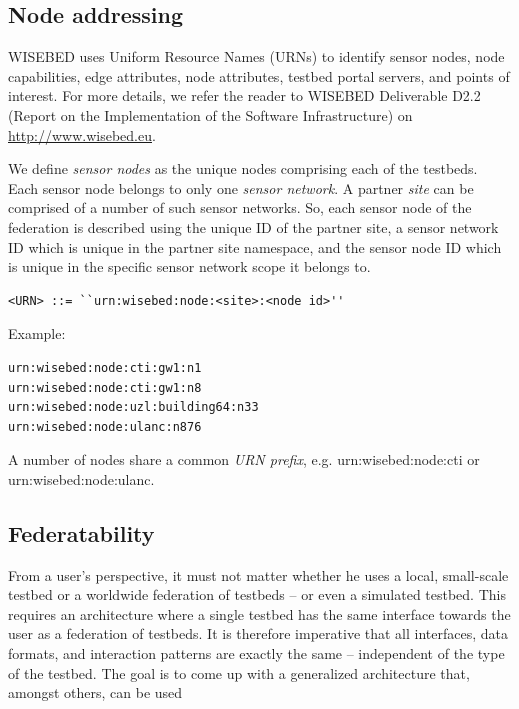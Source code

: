 \documentclass[a4paper,11pt]{article}
\begin{document}
	\subsection{Node addressing}
	\label{sec:addressing}
WISEBED uses Uniform Resource Names (URNs) to identify sensor nodes, node capabilities, edge attributes, node attributes, testbed portal servers, and points of interest. For more details, we refer the reader to WISEBED Deliverable D2.2 (Report on the Implementation of the Software Infrastructure) on \url{http://www.wisebed.eu}.

We define \textit{sensor nodes }as the unique nodes comprising each of the testbeds. Each sensor node belongs to only one \textit{sensor network}. A partner \textit{site} can be comprised of a number of such sensor networks. So, each sensor node of the federation is described using the unique ID of the partner site, a sensor network ID which is unique in the partner site namespace, and the sensor node ID which is unique in the specific sensor network scope it belongs to. 

\begin{lstlisting}
<URN> ::= ``urn:wisebed:node:<site>:<node id>''
\end{lstlisting}\medskip

\noindent Example: 

\begin{lstlisting}
urn:wisebed:node:cti:gw1:n1
urn:wisebed:node:cti:gw1:n8
urn:wisebed:node:uzl:building64:n33
urn:wisebed:node:ulanc:n876
\end{lstlisting}\medskip

A number of nodes share a common \emph{URN prefix}, e.g. urn:wisebed:node:cti or urn:wisebed:node:ulanc.

	\subsection{Federatability}
	\label{sec:federatability}
From a user's perspective, it must not matter whether he uses a local, small-scale testbed or a worldwide federation of testbeds -- or even a simulated testbed. This requires an architecture where a single testbed has the same interface towards the user as a federation of testbeds. It is therefore imperative that all interfaces, data formats, and interaction patterns are exactly the same -- independent of the type of the testbed. The goal is to come up with a generalized architecture that, amongst others, can be used 
\end{document}
